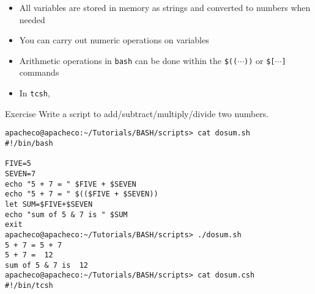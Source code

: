 \documentclass[slidestop,mathserif,compress,xcolor=svgnames]{beamer}
\newenvironment{bblock}[0]
{
\begin{beamerboxesrounded}[upper=uppercol1,lower=lowercol1,shadow=true]}
{\end{beamerboxesrounded}}
\begin{document}
\begin{frame}
\begin{itemize}
    \item All variables are stored in memory as strings and converted to numbers when needed
    \item You can carry out numeric operations on variables
    \item Arithmetic operations in \texttt{bash} can be done within the \texttt{\$(($\cdots$))} or \texttt{\$[$\cdots$]} commands
    \begin{enumerate}
      \fontsize{7}{10}
    \end{enumerate}
    \item In \texttt{tcsh},
    \begin{enumerate}
      \fontsize{7}{10}
    \end{enumerate}
  \end{itemize}
  \begin{bblock}{Exercise}
    Write a script to add/subtract/multiply/divide two numbers.
  \end{bblock}
  \framebreak
  {\tiny
    \begin{verbatim}
apacheco@apacheco:~/Tutorials/BASH/scripts> cat dosum.sh
#!/bin/bash

FIVE=5
SEVEN=7
echo "5 + 7 = " $FIVE + $SEVEN
echo "5 + 7 = " $(($FIVE + $SEVEN))
let SUM=$FIVE+$SEVEN
echo "sum of 5 & 7 is " $SUM
exit
apacheco@apacheco:~/Tutorials/BASH/scripts> ./dosum.sh 
5 + 7 = 5 + 7
5 + 7 =  12
sum of 5 & 7 is  12
apacheco@apacheco:~/Tutorials/BASH/scripts> cat dosum.csh
#!/bin/tcsh


\end{verbatim}}
\end{frame}
\end{document}
